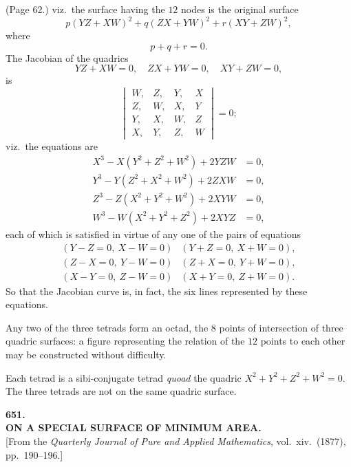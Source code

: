 \documentclass[11pt,a4paper]{article}
\begin{document}
\bigskip

\noindent (Page 62.) viz.\ the surface having the $12$ nodes is the original surface
\[
p(YZ + XW)^2 + q(ZX + YW)^2 + r(XY + ZW)^2,
\]
where
\[
p + q + r = 0.
\]
The Jacobian of the quadrics
\[
YZ + XW = 0,\quad ZX + YW = 0,\quad XY + ZW = 0,
\]
is
\[
\begin{vmatrix} W, & Z, & Y, & X \\ Z, & W, & X, & Y \\ Y, & X, & W, & Z \\ X, & Y, & Z, & W \end{vmatrix} = 0;
\]
viz.\ the equations are
\begin{align*}
X^3 - X(Y^2 + Z^2 + W^2) + 2YZW &= 0, \\
Y^3 - Y(Z^2 + X^2 + W^2) + 2ZXW &= 0, \\
Z^3 - Z(X^2 + Y^2 + W^2) + 2XYW &= 0, \\
W^3 - W(X^2 + Y^2 + Z^2) + 2XYZ &= 0,
\end{align*}
each of which is satisfied in virtue of any one of the pairs of equations
\[
\begin{array}{ll}
(Y - Z = 0,\ X - W = 0) & (Y + Z = 0,\ X + W = 0), \\
(Z - X = 0,\ Y - W = 0) & (Z + X = 0,\ Y + W = 0), \\
(X - Y = 0,\ Z - W = 0) & (X + Y = 0,\ Z + W = 0).
\end{array}
\]
So that the Jacobian curve is, in fact, the six lines represented by these equations.

Any two of the three tetrads form an octad, the $8$ points of intersection of three quadric surfaces: a figure representing the relation of the $12$ points to each other may be constructed without difficulty.

Each tetrad is a sibi-conjugate tetrad \textit{quoad} the quadric $X^2 + Y^2 + Z^2 + W^2 = 0$. The three tetrads are not on the same quadric surface.

\newpage


\begin{center}
{\Large\bfseries 651.}\\[1em]
{\large\bfseries ON A SPECIAL SURFACE OF MINIMUM AREA.}\\[0.5em]
[From the \textit{Quarterly Journal of Pure and Applied Mathematics}, vol.~xiv.\ (1877), pp.~190--196.]
\end{center}
\end{document}
